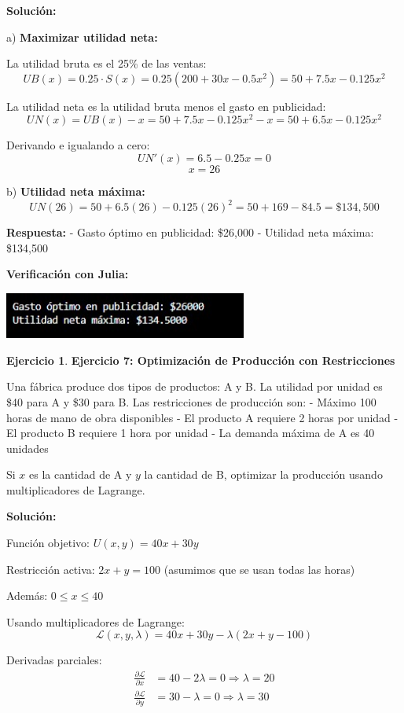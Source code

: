 \documentclass[12pt, a4paper, oneside]{book}
\theoremstyle{definition}
\newtheorem{ejercicio}{Ejercicio}[chapter]
\begin{document}
\textbf{Solución:}

a) \textbf{Maximizar utilidad neta:}

La utilidad bruta es el 25\% de las ventas:
$$UB(x) = 0.25 \cdot S(x) = 0.25(200 + 30x - 0.5x^2) = 50 + 7.5x - 0.125x^2$$

La utilidad neta es la utilidad bruta menos el gasto en publicidad:
$$UN(x) = UB(x) - x = 50 + 7.5x - 0.125x^2 - x = 50 + 6.5x - 0.125x^2$$

Derivando e igualando a cero:
$$UN'(x) = 6.5 - 0.25x = 0$$
$$x = 26$$

b) \textbf{Utilidad neta máxima:}
$$UN(26) = 50 + 6.5(26) - 0.125(26)^2 = 50 + 169 - 84.5 = \$134,500$$

\textbf{Respuesta:} 
- Gasto óptimo en publicidad: \$26,000
- Utilidad neta máxima: \$134,500

\textbf{Verificación con Julia:}


\begin{center}
\includegraphics[width=0.6\textwidth]{ejercicio6fm.png}
\end{center}

\begin{ejercicio}
\textbf{Ejercicio 7: Optimización de Producción con Restricciones}

Una fábrica produce dos tipos de productos: A y B. La utilidad por unidad es \$40 para A y \$30 para B. Las restricciones de producción son:
- Máximo 100 horas de mano de obra disponibles
- El producto A requiere 2 horas por unidad
- El producto B requiere 1 hora por unidad
- La demanda máxima de A es 40 unidades

Si $x$ es la cantidad de A y $y$ la cantidad de B, optimizar la producción usando multiplicadores de Lagrange.
\end{ejercicio}

\textbf{Solución:}

Función objetivo: $U(x,y) = 40x + 30y$

Restricción activa: $2x + y = 100$ (asumimos que se usan todas las horas)

Además: $0 \leq x \leq 40$

Usando multiplicadores de Lagrange:
$$\mathcal{L}(x,y,\lambda) = 40x + 30y - \lambda(2x + y - 100)$$

Derivadas parciales:
\begin{align*}
\frac{\partial \mathcal{L}}{\partial x} &= 40 - 2\lambda = 0 \Rightarrow \lambda = 20 \\
\frac{\partial \mathcal{L}}{\partial y} &= 30 - \lambda = 0 \Rightarrow \lambda = 30
\end{align*}
\end{document}
